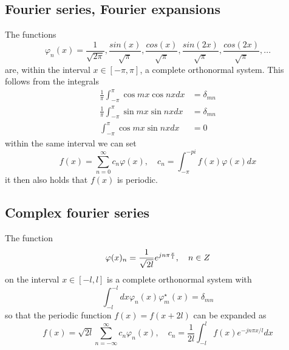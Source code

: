 \subsection{Fourier series, Fourier expansions}
The functions
\begin{equation}
    \varphi_n(x) = \frac{1}{\sqrt{2\pi}}, \frac{sin(x)}{\sqrt{\pi}}, \frac{cos(x)}{\sqrt{\pi}}, \frac{sin(2x)}{\sqrt{\pi}}, \frac{cos(2x)}{\sqrt{\pi}},...
\end{equation}
are, within the interval $x \in [-\pi,\pi]$, a complete orthonormal system. This follows from the integrals
\begin{equation}
    \begin{aligned}
    \frac{1}{\pi} \int_{-\pi}^{\pi} \cos m x \cos n x d x &=\delta_{m n} \\
    \frac{1}{\pi} \int_{-\pi}^{\pi} \sin m x \sin n x d x &=\delta_{m n} \\
    \int_{-\pi}^{\pi} \cos m x \sin n x d x &=0
\end{aligned}
\end{equation}
within the same interval we can set
\begin{equation}
    f(x) = \sum_{n = 0}^\infty c_n \varphi(x), \quad c_n = \int_{-\pi}^{-pi}f(x)\varphi(x)dx
\end{equation}
it then also holds that $f(x)$ is periodic.
\subsection{Complex fourier series}
The function
\begin{equation}
    \varphi(x)_n = \frac{1}{\sqrt{2 l}}e^{jn\pi \frac{x}{l}}, \quad n \in \AmSfont{Z}
\end{equation}
on the interval $x \in [-l,l]$ is a complete orthonormal system with
\begin{equation}
    \int_{-l}^{-l}dx \varphi_n(x) \varphi_m^\star(x) =\delta_{mn}
\end{equation}
so that the periodic function $f(x) = f(x+2l)$ can be expanded as
\begin{equation}
    f(x) = \sqrt{2l} \sum_{n = -\infty}^\infty c_n \varphi_n(x), \quad c_n = \frac{1}{2l} \int_{-l}^{l} f(x)e^{-jn\pi x/l}dx
\end{equation}
